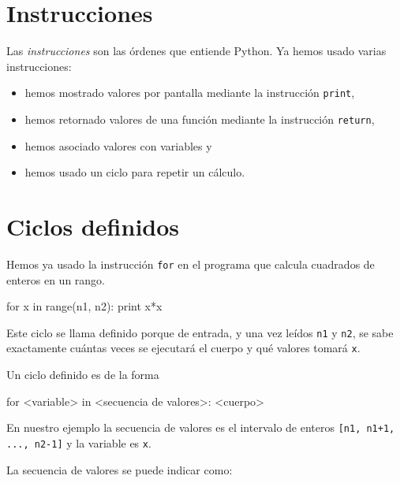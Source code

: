 \section{Instrucciones}

Las {\it instrucciones} son las órdenes que entiende Python. Ya
hemos usado varias instrucciones:

\begin{itemize}

\item hemos mostrado valores por pantalla mediante la instrucción
\lstinline!print!,

\item hemos retornado valores de una función mediante la
instrucción \lstinline!return!,

\item hemos asociado valores con variables y

\item hemos usado un ciclo para repetir un cálculo.
\end{itemize}

\section{Ciclos definidos}
\label{ciclosdef}
Hemos ya usado la instrucción \lstinline!for! en el programa que calcula
cuadrados de enteros en un rango.

\begin{codigo-python-sn}
    for x in range(n1, n2):
        print x*x
\end{codigo-python-sn}

Este ciclo se llama definido porque de entrada, y una vez leídos
\lstinline!n1! y \lstinline!n2!, se sabe exactamente cuántas veces se ejecutará
el cuerpo y qué valores tomará \lstinline!x!.

Un ciclo definido es de la forma

\begin{codigo-python-sn}
for <variable> in <secuencia de valores>:
    <cuerpo>
\end{codigo-python-sn}

En nuestro ejemplo la secuencia de valores es el intervalo de
enteros \lstinline![n1, n1+1, ..., n2-1]! y la variable es \lstinline!x!.

La secuencia de valores se puede indicar como:


